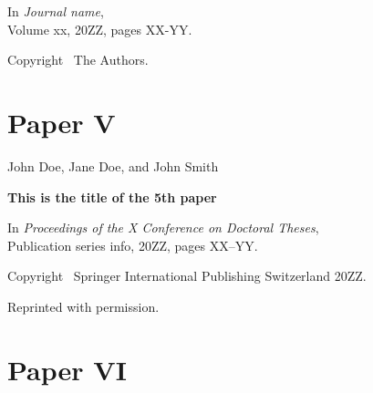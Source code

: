 \documentclass[officiallayout]{tktla}
\begin{document}
\vspace{10pt}
\noindent
In \emph{Journal name}, \\Volume xx, 20ZZ, pages XX-YY.

\vspace{60pt}
\noindent Copyright \textcopyright\ The Authors.

\cleardoublepage
%

 
\chapter*{Paper V}\thispagestyle{empty}


\vspace{80pt}
\noindent John Doe, Jane Doe, and John Smith

\vspace{10pt}
\noindent\textbf{This is the title of the 5th paper}

\vspace{10pt}
\noindent
In \emph{Proceedings of the X Conference on Doctoral Theses}, 
\\Publication series info, 20ZZ, pages XX--YY.

\vspace{60pt}
\noindent Copyright \textcopyright\ Springer International Publishing Switzerland 20ZZ. 

\noindent Reprinted with permission.

\cleardoublepage
%


\chapter*{Paper VI}\thispagestyle{empty}

\end{document}
